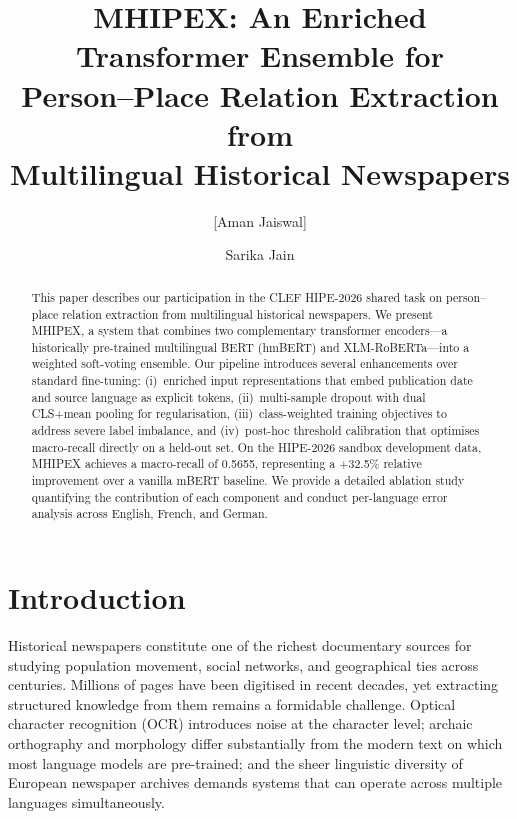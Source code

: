 \documentclass[runningheads]{llncs}
\begin{document}
\title{MHIPEX: An Enriched Transformer Ensemble for\\Person--Place Relation Extraction from\\Multilingual Historical Newspapers}

\author{[Aman Jaiswal] \and Sarika Jain}

\maketitle

\begin{abstract}
This paper describes our participation in the CLEF HIPE-2026 shared task on person--place relation extraction from multilingual historical newspapers. We present MHIPEX, a system that combines two complementary transformer encoders---a historically pre-trained multilingual BERT (hmBERT) and XLM-RoBERTa---into a weighted soft-voting ensemble. Our pipeline introduces several enhancements over standard fine-tuning: (i)~enriched input representations that embed publication date and source language as explicit tokens, (ii)~multi-sample dropout with dual CLS+mean pooling for regularisation, (iii)~class-weighted training objectives to address severe label imbalance, and (iv)~post-hoc threshold calibration that optimises macro-recall directly on a held-out set. On the HIPE-2026 sandbox development data, MHIPEX achieves a macro-recall of 0.5655, representing a +32.5\% relative improvement over a vanilla mBERT baseline. We provide a detailed ablation study quantifying the contribution of each component and conduct per-language error analysis across English, French, and German.
\end{abstract}


\section{Introduction}
\label{sec:intro}

Historical newspapers constitute one of the richest documentary sources for studying population movement, social networks, and geographical ties across centuries. Millions of pages have been digitised in recent decades, yet extracting structured knowledge from them remains a formidable challenge. Optical character recognition (OCR) introduces noise at the character level; archaic orthography and morphology differ substantially from the modern text on which most language models are pre-trained; and the sheer linguistic diversity of European newspaper archives demands systems that can operate across multiple languages simultaneously.
\end{document}
